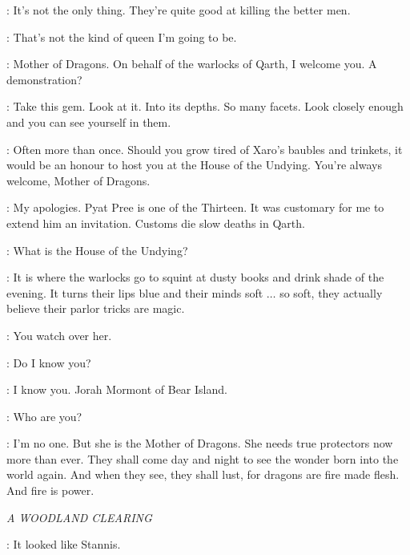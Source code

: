 \JORAH: It's not the only thing. They're quite good at killing the better men. 

\DAENERYS: That's not the kind of queen I'm going to be. 


\PYAT: Mother of Dragons. On behalf of the warlocks of Qarth, I welcome you. A demonstration? 


\PYAT: Take this gem. Look at it. Into its depths. So many facets. Look closely enough and you can see yourself in them. 


\PYAT: Often more than once. Should you grow tired of Xaro's baubles and trinkets, it would be an honour to host you at the House of the Undying. You're always welcome, Mother of Dragons. 


\XARO: My apologies. Pyat Pree is one of the Thirteen. It was customary for me to extend him an invitation. Customs die slow deaths in Qarth. 

\DAENERYS: What is the House of the Undying? 

\XARO: It is where the warlocks go to squint at dusty books and drink shade of the evening. It turns their lips blue and their minds soft $\ldots$ so soft, they actually believe their parlor tricks are magic. 


\QUAITHE: You watch over her. 

\JORAH: Do I know you? 

\QUAITHE: I know you. Jorah Mormont of Bear Island. 

\JORAH: Who are you? 

\QUAITHE: I'm no one. But she is the Mother of Dragons. She needs true protectors now more than ever. They shall come day and night to see the wonder born into the world again. And when they see, they shall lust, for dragons are fire made flesh. And fire is power. 



\scene

\textit{A WOODLAND CLEARING} 


\BRIENNE: It looked like Stannis. 

